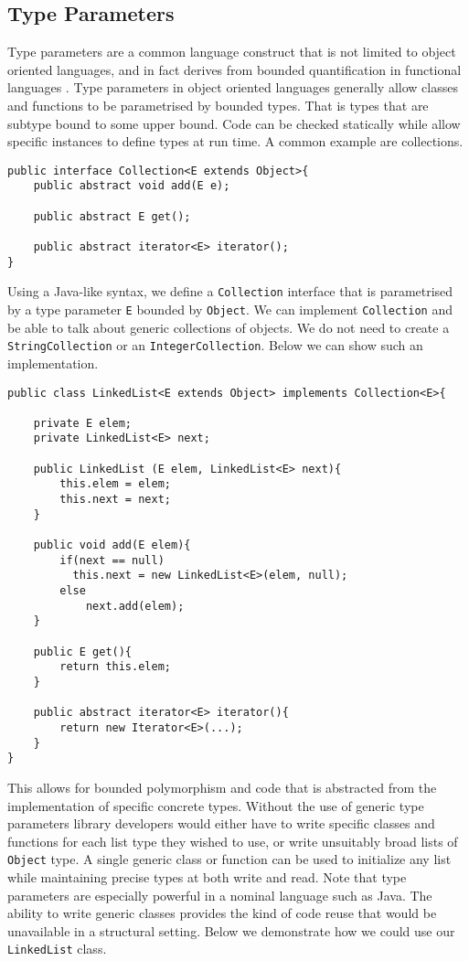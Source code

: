 \documentclass[11pt
              , a4paper
              , twoside
              , openright
              ]{report}
\numberwithin{case}{theorem}
\numberwithin{subcase}{case}
\begin{document}
\subsection{Type Parameters}
Type parameters are a common language construct that is not limited to object oriented languages, and in fact derives from bounded quantification in functional languages \cite{Canning:1989:FPO:99370.99392, Cardelli:1985:UTD:6041.6042}. Type parameters in object oriented languages generally allow classes and functions to be parametrised by bounded types. That is types that are subtype bound to some upper bound. Code can be checked statically while allow specific instances to define types at run time. A common example are collections.
\begin{lstlisting}[mathescape, style=custom_lang]
public interface Collection<E extends Object>{
	public abstract void add(E e);
	
	public abstract E get();
	
	public abstract iterator<E> iterator();
}
\end{lstlisting}
Using a Java-like syntax, we define a \verb|Collection| interface that is parametrised by a type parameter \verb|E| bounded by \verb|Object|. We can implement \verb|Collection| and be able to talk about generic collections of objects. We do not need to create a \verb|StringCollection| or an \verb|IntegerCollection|. Below we can show such an implementation.
\begin{lstlisting}[mathescape, style=custom_lang]
public class LinkedList<E extends Object> implements Collection<E>{

	private E elem;
	private LinkedList<E> next;
	
	public LinkedList (E elem, LinkedList<E> next){
		this.elem = elem;
		this.next = next;
	}
	
	public void add(E elem){
		if(next == null)
		  this.next = new LinkedList<E>(elem, null);
		else
			next.add(elem);
	}
	
	public E get(){
		return this.elem;
	}
	
	public abstract iterator<E> iterator(){
		return new Iterator<E>(...);
	}
}
\end{lstlisting}
This allows for bounded polymorphism and code that is abstracted from the implementation of specific concrete types. Without the use of generic type parameters library developers would either have to write specific classes and functions for each list type they wished to use, or write unsuitably broad lists of \verb|Object| type. A single generic class or function can be used to initialize any list while maintaining precise types at both write and read. Note that type parameters are especially powerful in a nominal language such as Java. The ability to write generic classes provides the kind of code reuse that would be unavailable in a structural setting. Below we demonstrate how we could use our \verb|LinkedList| class.
\end{document}

